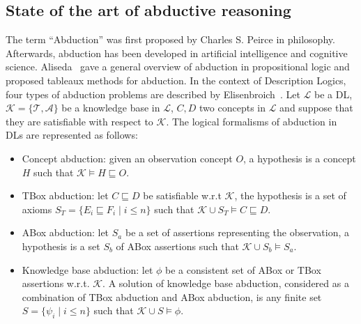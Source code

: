 \documentclass{article}
\begin{document}
\subsection{State of the art of abductive reasoning}
The term ``Abduction'' was first proposed by Charles S. Peirce in philosophy.
Afterwards, abduction has been developed in artificial intelligence and cognitive science.
Aliseda~\cite{aliseda1997seeking} gave a general overview of abduction in propositional logic and proposed tableaux methods for abduction.
In the context of Description Logics, four types of abduction problems  are described by Elisenbroich~\cite{elsenbroich2006case}.
Let $\mathcal{L}$ be a DL, $\mathcal{K}=\{\mathcal{T},\mathcal{A}\}$ be a knowledge base in $\mathcal{L}$, $C,D$ two concepts in $\mathcal{L}$ and suppose that they are satisfiable
with respect to  $\mathcal{K}$.
The logical formalisms of abduction in DLs are represented as follows:
\begin{itemize}
 \item Concept abduction: given an observation concept $O$, a hypothesis is a concept $H$ such that $\mathcal{K}\vDash H \sqsubseteq O$.
 \item TBox abduction: let $C\sqsubseteq D$ be satisfiable w.r.t $\mathcal{K}$, the hypothesis is a set of axioms $S_T=\{E_i\sqsubseteq F_i \mid i\leq n\}$
 such that $ \mathcal{K}\cup S_T\vDash C\sqsubseteq D$.
 \item ABox abduction: let $S_a$ be a set of assertions representing the observation, a hypothesis is a set $S_b$ of ABox assertions such that $\mathcal{K} \cup S_b\vDash S_a$.
 \item Knowledge base abduction: let $\phi$ be a consistent set of ABox or TBox assertions w.r.t. $\mathcal{K}$. A solution of knowledge base abduction, considered 
 as a combination of TBox abduction and ABox abduction, is any finite set $S=\{\psi_i \mid i\leq n\}$ such that $ \mathcal{K} \cup S \vDash \phi$.
\end{itemize}

\end{document}

